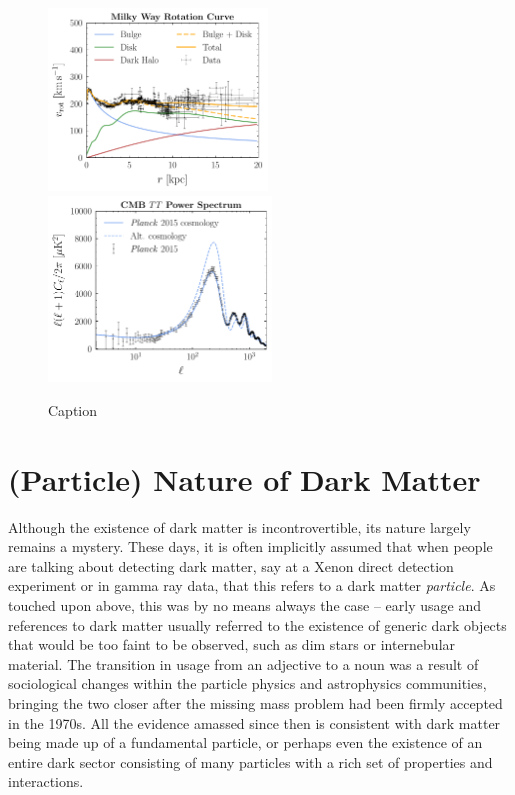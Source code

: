 \begin{figure}[htbp] 
\hspace{-0.9 cm} 
\includegraphics[width=0.5185\textwidth]{rotcurves.pdf}
 \includegraphics[width=0.528\textwidth]{cells.pdf}  
\caption{Caption}  
\label{fig:evidence}
\end{figure}


\section{(Particle) Nature of Dark Matter}
\label{sec:particledm}

Although the existence of dark matter is incontrovertible, its nature largely remains a mystery. These days, it is often implicitly assumed that when people are talking about detecting dark matter, say at a Xenon direct detection experiment or in gamma ray data, that this refers to a dark matter \emph{particle}. As touched upon above, this was by no means always the case -- early usage and references to dark matter usually referred to the existence of generic dark objects that would be too faint to be observed, such as dim stars or internebular material. The transition in usage from an adjective to a noun was a result of sociological changes within the particle physics and astrophysics communities, bringing the two closer after the missing mass problem had been firmly accepted in the 1970s. All the evidence amassed since then is consistent with dark matter being made up of a fundamental particle, or perhaps even the existence of an entire dark sector consisting of many particles with a rich set of properties and interactions.

